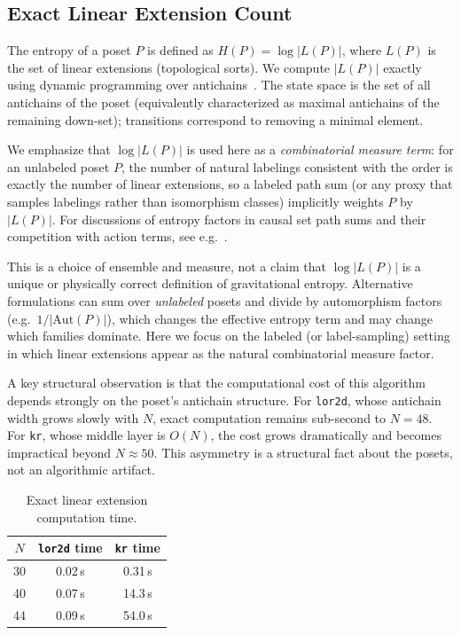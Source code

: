 \documentclass[11pt,a4paper]{article}
\begin{document}
\subsection{Exact Linear Extension Count}

The entropy of a poset $P$ is defined as $H(P) = \log |L(P)|$, where $L(P)$ is the set of linear extensions (topological sorts). We compute $|L(P)|$ exactly using dynamic programming over antichains~\cite{brightwell1991}. The state space is the set of all antichains of the poset (equivalently characterized as maximal antichains of the remaining down-set); transitions correspond to removing a minimal element.

We emphasize that $\log|L(P)|$ is used here as a \emph{combinatorial measure term}: for an unlabeled poset $P$, the number of natural labelings consistent with the order is exactly the number of linear extensions, so a labeled path sum (or any proxy that samples labelings rather than isomorphism classes) implicitly weights $P$ by $|L(P)|$. For discussions of entropy factors in causal set path sums and their competition with action terms, see e.g.~\cite{mathur2021}.

This is a choice of ensemble and measure, not a claim that $\log|L(P)|$ is a
unique or physically correct definition of gravitational entropy. Alternative
formulations can sum over \emph{unlabeled} posets and divide by automorphism
factors (e.g.\ $1/|\mathrm{Aut}(P)|$), which changes the effective entropy term
and may change which families dominate. Here we focus on the labeled (or
label-sampling) setting in which linear extensions appear as the natural
combinatorial measure factor.

A key structural observation is that the computational cost of this algorithm depends strongly on the poset's antichain structure. For \texttt{lor2d}, whose antichain width grows slowly with $N$, exact computation remains sub-second to $N = 48$. For \texttt{kr}, whose middle layer is $O(N)$, the cost grows dramatically and becomes impractical beyond $N \approx 50$. This asymmetry is a structural fact about the posets, not an algorithmic artifact.

\begin{table}[H]
\centering
\caption{Exact linear extension computation time.}
\label{tab:timing}
\begin{tabular}{ccc}
\toprule
$N$ & \texttt{lor2d} time & \texttt{kr} time \\
\midrule
30 & 0.02\,s & 0.31\,s \\
40 & 0.07\,s & 14.3\,s \\
44 & 0.09\,s & 54.0\,s \\
\bottomrule
\end{tabular}
\end{table}
\end{document}
